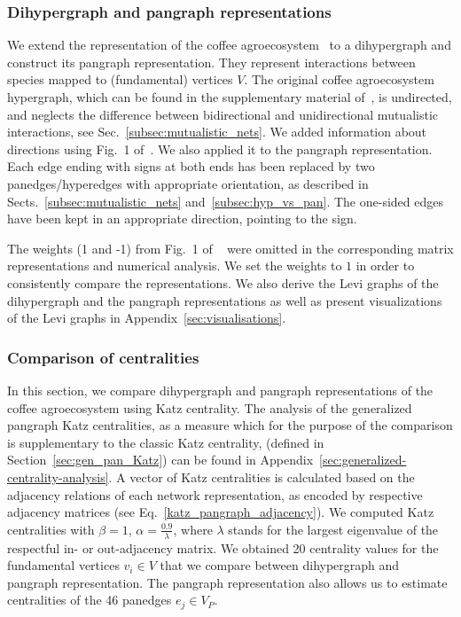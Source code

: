\documentclass[a4paper,12pt]{article}
\theoremstyle{definition}
\theoremstyle{remark}
\begin{document}
\subsubsection{Dihypergraph and pangraph representations}
We extend the representation of the coffee agroecosystem~\cite{GOLUBSKI2016344} to a dihypergraph and construct its pangraph representation. They represent interactions between species mapped to (fundamental) vertices $V$. The original coffee agroecosystem hypergraph, which can be found in the supplementary material of~\cite{GOLUBSKI2016344}, is undirected, and neglects the difference between bidirectional and unidirectional mutualistic interactions, see Sec.~\ref{subsec:mutualistic_nets}. We added information about directions using Fig.~1 of~\cite{GOLUBSKI2016344}. We also applied it to the pangraph representation. Each edge ending with signs at both ends has been replaced by two panedges/hyperedges with appropriate orientation, as described in Sects.~\ref{subsec:mutualistic_nets} and~\ref{subsec:hyp_vs_pan}. The one-sided edges have been kept in an appropriate direction, pointing to the sign.

The weights (1 and -1) from Fig.~1 of ~\cite{GOLUBSKI2016344} were omitted in the corresponding matrix representations and numerical analysis. We set the weights to $1$ in order to consistently compare the representations. We also derive the Levi graphs of the dihypergraph and the pangraph representations as well as present visualizations of the Levi graphs in Appendix~\ref{sec:visualisations}.

\subsubsection{Comparison of centralities}

In this section, we compare dihypergraph and pangraph representations of the coffee agroecosystem using Katz centrality. The analysis of the generalized pangraph Katz centralities, as a measure which for the purpose of the comparison is supplementary to the classic Katz centrality, (defined in Section~\ref{sec:gen_pan_Katz}) can be found in Appendix~\ref{sec:generalized-centrality-analysis}.
A vector of Katz centralities is calculated based on the adjacency relations of each network representation, as encoded by respective adjacency matrices (see Eq.~\ref{katz_pangraph_adjacency}). We computed Katz centralities with $\beta = 1$, $\alpha=\frac{0.9}{\lambda}$, where $\lambda$ stands for the largest eigenvalue of the respectful in- or out-adjacency matrix. We obtained 20 centrality values for the fundamental vertices $v_i \in V$ that we compare between dihypergraph and pangraph representation. The pangraph representation also allows us to estimate centralities of the 46 panedges $e_j \in V_P$.
\end{document}
